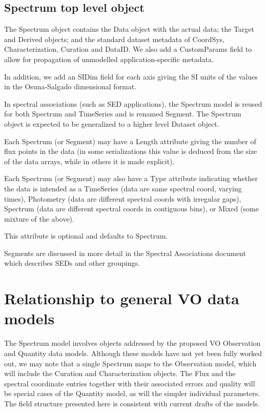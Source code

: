 \documentclass[11pt]{article}
\begin{document}
\subsection{Spectrum top level object}

The Spectrum object contains the Data object with the actual
data; the Target and Derived objects; and the standard
dataset metadata of CoordSys, Characterization,
Curation and DataID. We also add a CustomParams field
to allow for propagation of unmodelled application-specific metadata.

In addition,
we add an SIDim field for each axis giving the SI units of the
values in the Osuna-Salgado dimensional format.

In spectral associations (such as SED applications), 
the Spectrum model is reused for both Spectrum and
TimeSeries and is renamed Segment. The Spectrum object is expected to be
generalized to a higher level Dataset object.


Each Spectrum (or Segment) may have a Length attribute giving the
number of flux points in the data (in some serializations
this value is deduced from the size of the data arrays, while in
others it is made explicit).

Each Spectrum (or Segment) may also have a Type attribute indicating
whether the data is intended as a TimeSeries (data are same spectral
coord, varying times), Photometry (data are different spectral coords
with irregular gaps), Spectrum (data are different spectral coords in
contiguous bins), or Mixed (some mixture of the above). 
 
This attribute is optional and defaults to Spectrum.

Segments are discussed in more detail in the Spectral Associations document
which describes SEDs and other groupings.


\clearpage


\section{Relationship to general VO data models}

The Spectrum model involves objects addressed by the proposed VO
Observation and Quantity data models. Although these models have not yet
been fully worked out, we may note that a single Spectrum maps to the
Observation model, which will include the Curation and Characterization objects.
The Flux and the spectral coordinate entries together with their
associated errors and quality will be special cases of the Quantity
model, as will the simpler individual parameters. The field structure
presented here is consistent with current drafts of the models.
\end{document}
